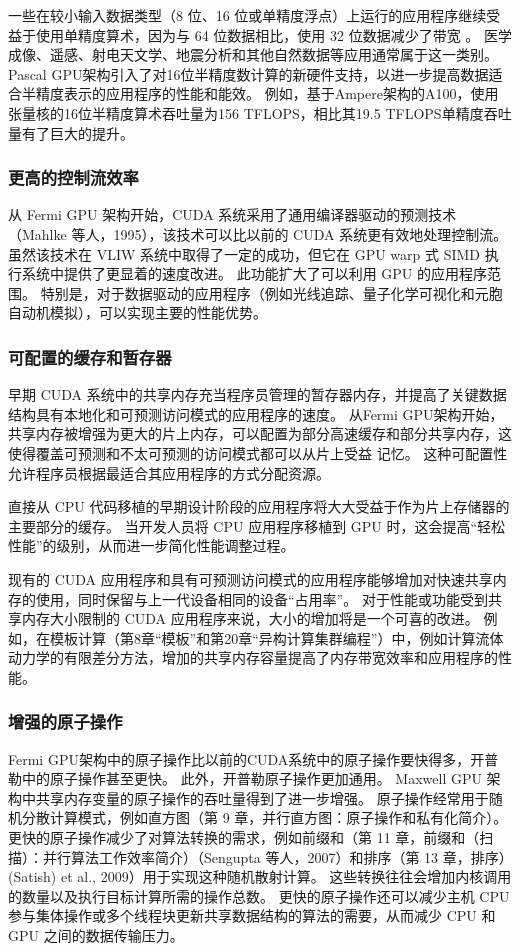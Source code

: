 一些在较小输入数据类型（8 位、16 位或单精度浮点）上运行的应用程序继续受益于使用单精度算术，因为与 64 位数据相比，使用 32 位数据减少了带宽 。 医学成像、遥感、射电天文学、地震分析和其他自然数据等应用通常属于这一类别。 Pascal GPU架构引入了对16位半精度数计算的新硬件支持，以进一步提高数据适合半精度表示的应用程序的性能和能效。 例如，基于Ampere架构的A100，使用张量核的16位半精度算术吞吐量为156 TFLOPS，相比其19.5 TFLOPS单精度吞吐量有了巨大的提升。

\subsubsection{更高的控制流效率}
从 Fermi GPU 架构开始，CUDA 系统采用了通用编译器驱动的预测技术（Mahlke 等人，1995），该技术可以比以前的 CUDA 系统更有效地处理控制流。 虽然该技术在 VLIW 系统中取得了一定的成功，但它在 GPU warp 式 SIMD 执行系统中提供了更显着的速度改进。 此功能扩大了可以利用 GPU 的应用程序范围。 特别是，对于数据驱动的应用程序（例如光线追踪、量子化学可视化和元胞自动机模拟），可以实现主要的性能优势。

\subsubsection{可配置的缓存和暂存器}
早期 CUDA 系统中的共享内存充当程序员管理的暂存器内存，并提高了关键数据结构具有本地化和可预测访问模式的应用程序的速度。 从Fermi GPU架构开始，共享内存被增强为更大的片上内存，可以配置为部分高速缓存和部分共享内存，这使得覆盖可预测和不太可预测的访问模式都可以从片上受益 记忆。 这种可配置性允许程序员根据最适合其应用程序的方式分配资源。

直接从 CPU 代码移植的早期设计阶段的应用程序将大大受益于作为片上存储器的主要部分的缓存。 当开发人员将 CPU 应用程序移植到 GPU 时，这会提高“轻松性能”的级别，从而进一步简化性能调整过程。

现有的 CUDA 应用程序和具有可预测访问模式的应用程序能够增加对快速共享内存的使用，同时保留与上一代设备相同的设备“占用率”。 对于性能或功能受到共享内存大小限制的 CUDA 应用程序来说，大小的增加将是一个可喜的改进。 例如，在模板计算（第8章“模板”和第20章“异构计算集群编程”）中，例如计算流体动力学的有限差分方法，增加的共享内存容量提高了内存带宽效率和应用程序的性能。

\subsubsection{增强的原子操作}
Fermi GPU架构中的原子操作比以前的CUDA系统中的原子操作要快得多，开普勒中的原子操作甚至更快。 此外，开普勒原子操作更加通用。 Maxwell GPU 架构中共享内存变量的原子操作的吞吐量得到了进一步增强。 原子操作经常用于随机分散计算模式，例如直方图（第 9 章，并行直方图：原子操作和私有化简介）。 更快的原子操作减少了对算法转换的需求，例如前缀和（第 11 章，前缀和（扫描）：并行算法工作效率简介）（Sengupta 等人，2007）和排序（第 13 章，排序）(Satish) et al., 2009）用于实现这种随机散射计算。 这些转换往往会增加内核调用的数量以及执行目标计算所需的操作总数。 更快的原子操作还可以减少主机 CPU 参与集体操作或多个线程块更新共享数据结构的算法的需要，从而减少 CPU 和 GPU 之间的数据传输压力。

